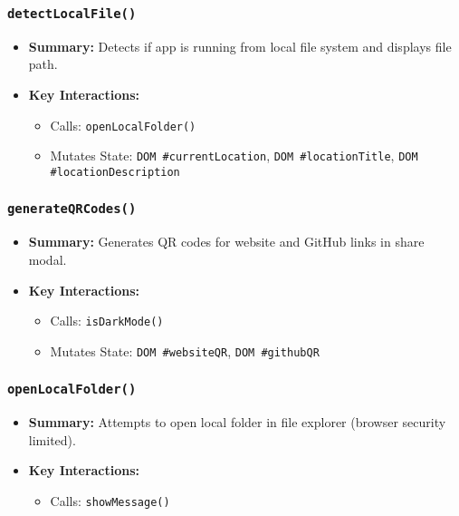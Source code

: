 \documentclass[11pt,letterpaper]{article}
\begin{document}
\subsubsection{\texttt{detectLocalFile()}}
\begin{itemize}
    \item \textbf{Summary:} Detects if app is running from local file system and displays file path.
    \item \textbf{Key Interactions:}
    \begin{itemize}
        \item Calls: \texttt{openLocalFolder()}
        \item Mutates State: \texttt{DOM \#currentLocation}, \texttt{DOM \#locationTitle}, \texttt{DOM \#locationDescription}
    \end{itemize}
\end{itemize}

\subsubsection{\texttt{generateQRCodes()}}
\begin{itemize}
    \item \textbf{Summary:} Generates QR codes for website and GitHub links in share modal.
    \item \textbf{Key Interactions:}
    \begin{itemize}
        \item Calls: \texttt{isDarkMode()}
        \item Mutates State: \texttt{DOM \#websiteQR}, \texttt{DOM \#githubQR}
    \end{itemize}
\end{itemize}

\subsubsection{\texttt{openLocalFolder()}}
\begin{itemize}
    \item \textbf{Summary:} Attempts to open local folder in file explorer (browser security limited).
    \item \textbf{Key Interactions:}
    \begin{itemize}
        \item Calls: \texttt{showMessage()}
    \end{itemize}
\end{itemize}
\end{document}
